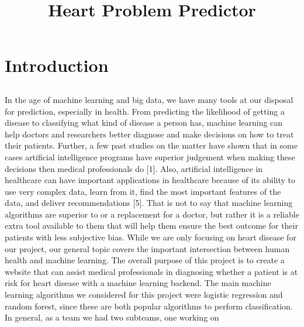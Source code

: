\documentclass[12pt]{article}
\title{\textbf{Heart Problem Predictor}}
\author{}
\date{}
\begin{document}
\titlespacing*{\section}{0pt}{0.25cm}{0.25cm}
\titlespacing*{\subsection}{0pt}{0.5cm}{0.5cm}
\maketitle

\section*{Introduction}

\subsection*{}
In the age of machine learning and big data, we have many tools at our 
disposal for prediction, especially in health. From predicting the 
likelihood of getting a disease to classifying what kind of disease a 
person has, machine learning can help doctors and researchers better 
diagnose and make decisions on how to treat their patients. Further, a few 
past studies on the matter have shown that in some cases artificial 
intelligence programs have superior judgement when making these decisions 
then medical professionals do [1]. Also, artificial intelligence in 
healthcare can have important applications in healthcare because of 
its ability to use very complex data, learn from it, find the most 
important features of the data, and deliver recommendations [5]. 
That is not to say that machine learning algorithms are superior to or a 
replacement for a doctor, but rather it is a reliable extra tool available 
to them that will help them ensure the best outcome for their patients 
with less subjective bias. While we are only focusing on heart disease 
for our project, our general topic covers the important intersection 
between human health and machine learning.
The overall purpose of this project is to create a website that can assist 
medical professionals in diagnosing whether a patient is at risk for heart 
disease with a machine learning backend. The main machine learning 
algorithms we considered for this project were logistic regression 
and random forest, since these are both popular algorithms to perform 
classification. In general, as a team we had two subteams, one working on 
\end{document}
